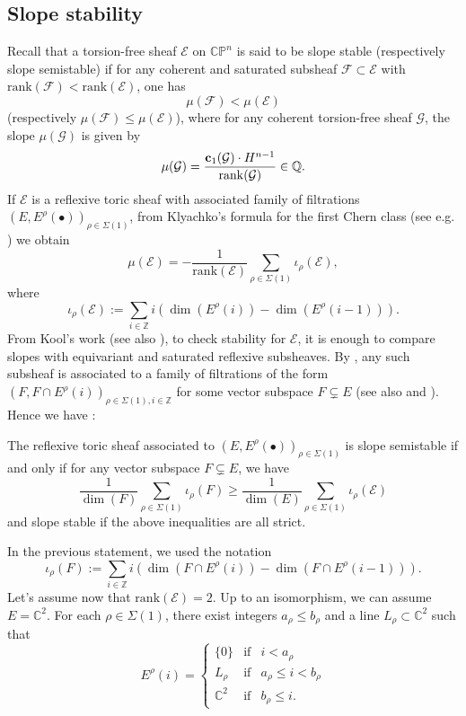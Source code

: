 \documentclass[a4paper,10pt]{amsart}
\theoremstyle{plain}{
    \newtheorem{theorem}{Theorem}[section]
    \newtheorem{lemma}[theorem]{Lemma}
    \newtheorem{corollary}[theorem]{Corollary}
    \newtheorem{proposition}[theorem]{Proposition}
    \newtheorem{conjecture}[theorem]{Conjecture}
}
\theoremstyle{definition}{
    \newtheorem{definition}[theorem]{Definition}
    \newtheorem{defn-thm}[theorem]{Definition-Theorem}
    \newtheorem{example}[theorem]{Example}
    \newtheorem{notation}[theorem]{Notation}
}
\theoremstyle{remark}{
    \newtheorem{remark}[theorem]{Remark}
    \newtheorem{problem}[theorem]{Problem}
    \newtheorem{question}[theorem]{Question}
}
\def\rank{\mathrm{rank}}
\def\uc{{\bf c}}
\def\cF{\mathcal{F}}
\def\cE{\mathcal{E}}
\def\cG{\mathcal{G}}
\def\Q{\mathbb{Q}}
\def\Z{\mathbb{Z}}
\def\P{\mathbb{P}}
\def\C{\mathbb{C}}
\begin{document}
\subsection{Slope stability}
\label{sec:slope stability}
Recall that a torsion-free sheaf $\cE$ on $\C\P^n$ is said to be  slope stable (respectively slope semistable) if for any coherent and saturated subsheaf $\cF\subset \cE$ with $\rank(\cF)<\rank(\cE)$, one has
$$
\mu(\cF)<\mu(\cE)
$$
(respectively $\mu(\cF)\leq \mu(\cE)$),
where for any coherent torsion-free sheaf $\cG$, the slope $\mu(\cG)$ is given by
$$
\mu(\cG)=\frac{\uc_1(\cG)\cdot H^{n-1}}{\rank(\cG)}\in\Q.
$$
If $\cE$ is a reflexive toric sheaf with associated family of filtrations $(E,E^\rho(\bullet))_{\rho\in\Sigma(1)}$, from Klyachko's formula for the first Chern class (see e.g. \cite[Corollary 2.18]{CT22}) we obtain
\begin{equation}
 \label{eq:slope}
 \mu(\cE)=-\frac{1}{\rank(\cE)}\sum_{\rho\in\Sigma(1)} \iota_\rho(\cE),
\end{equation}
  where
 $$
 \iota_\rho(\cE):=\sum_{i\in\Z} i \left(\dim(E^\rho(i))-\dim (E^\rho(i-1))\right).
 $$
From Kool's work \cite[Proposition 4.13]{Koo11} (see also \cite[Proposition 2.3]{HNS19}), to check stability for $\cE$, it is enough to compare slopes with equivariant and saturated reflexive subsheaves. By \cite[Lemma 2.14]{NaTip}, any such subsheaf is associated to a family of filtrations of the form $(F, F\cap E^\rho(i))_{\rho\in\Sigma(1),i\in\Z}$ for some vector subspace $F\subsetneq E$ (see also \cite[Proposition 0.0.1]{DDK20} and \cite[Remark 1.2.4]{HNS19}). Hence we have :
\begin{proposition}
\label{prop:stability equiv}
The reflexive toric sheaf associated to $(E,E^\rho(\bullet))_{\rho\in\Sigma(1)}$ is slope semistable if and only if for any vector subspace $F\subsetneq E$, we have
$$
\frac{1}{\dim(F)}\sum_{\rho\in\Sigma(1)} \iota_\rho(F)\geq \frac{1}{\dim(E)}\sum_{\rho\in\Sigma(1)} \iota_\rho(\cE)
$$
and slope stable if the above inequalities are all strict.
 \end{proposition}
 In the previous statement, we used the notation 
$$
 \iota_\rho(F):=\displaystyle\sum_{i\in\Z} i \left(\dim(F\cap E^\rho(i))-\dim (F\cap E^\rho(i-1))\right).
$$
Let's assume now that $\rank(\cE)=2$. Up to an isomorphism, we can assume $E=\C^2$. For each $\rho\in\Sigma(1)$, there exist integers $a_\rho \leq b_\rho$ and a line $L_\rho\subset\C^2$ such that 
 $$
 E^\rho(i)=\left\{
 \begin{array}{ccc}
                  \lbrace 0 \rbrace & \mathrm{ if } & i< a_\rho \\
                 L_\rho & \mathrm{ if } & a_\rho\leq i< b_\rho \\
\C^2 & \mathrm{ if } & b_\rho\leq i .
                  \end{array}
                  \right.
 $$
\end{document}
